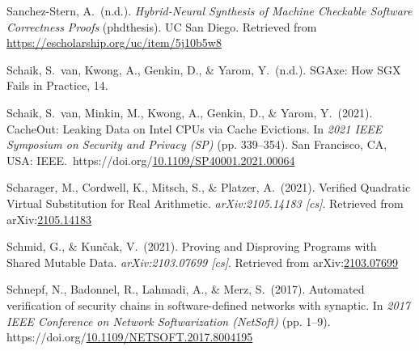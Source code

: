 \documentclass[12pt,twoside]{article}
\begin{document}
{\begin{thebibliography}{1079}
\mdbibitemlabel{}Sanchez-Stern, A.~(n.d.). \emph{Hybrid-Neural Synthesis of Machine Checkable Software Correctness Proofs} (phdthesis). UC San Diego. Retrieved from \href{https://escholarship.org/uc/item/5j10b5w8}{{\ttfamily https://\hspace{0pt}escholarship.\hspace{0pt}org/\hspace{0pt}uc/\hspace{0pt}item/\hspace{0pt}5j10b5w8}}%

\mdbibitemlabel{}Schaik, S.~van, Kwong, A., Genkin, D., \& Yarom, Y.~(n.d.). SGAxe: How SGX Fails in Practice, 14.%

\mdbibitemlabel{}Schaik, S.~van, Minkin, M., Kwong, A., Genkin, D., \& Yarom, Y.~(2021). CacheOut: Leaking Data on Intel CPUs via Cache Evictions. In \emph{2021 IEEE Symposium on Security and Privacy (SP)} (pp. 339–354). San Francisco, CA, USA: IEEE.~https://doi.org/\href{https://dx.doi.org/10.1109/SP40001.2021.00064}{10.1109/SP40001.2021.00064}%

\mdbibitemlabel{}Scharager, M., Cordwell, K., Mitsch, S., \& Platzer, A.~(2021). Verified Quadratic Virtual Substitution for Real Arithmetic. \emph{arXiv:2105.14183 {}[cs]}. Retrieved from arXiv:\href{http://arxiv.org/abs/2105.14183}{2105.14183}%

\mdbibitemlabel{}Schmid, G., \& Kunčak, V.~(2021). Proving and Disproving Programs with Shared Mutable Data. \emph{arXiv:2103.07699 {}[cs]}. Retrieved from arXiv:\href{http://arxiv.org/abs/2103.07699}{2103.07699}%

\mdbibitemlabel{}Schnepf, N., Badonnel, R., Lahmadi, A., \& Merz, S.~(2017). Automated verification of security chains in software-defined networks with synaptic. In \emph{2017 IEEE Conference on Network Softwarization (NetSoft)} (pp. 1–9). https://doi.org/\href{https://dx.doi.org/10.1109/NETSOFT.2017.8004195}{10.1109/NETSOFT.2017.8004195}%


\end{thebibliography}}
\end{document}
